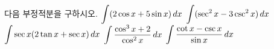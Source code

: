 다음 부정적분을 구하시오.
 $\displaystyle\int (2\cos x+5\sin x)\mkern3mu dx$
 $\displaystyle\int (\sec^2 x-3\csc^2 x)\mkern3mu dx$
 $\displaystyle\int \sec x(2\tan x+\sec x)\mkern3mu dx$
 $\displaystyle\int \dfrac{\cos^3 x+2}{\cos^2 x}\mkern3mu dx$
 $\displaystyle\int \dfrac{\cot x-\csc x}{\sin x}\mkern3mu dx$
